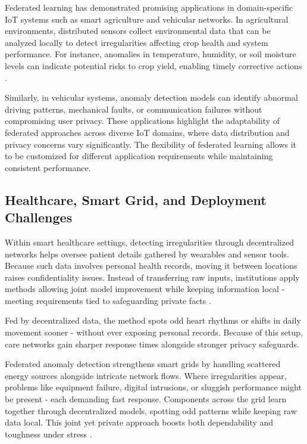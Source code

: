 \documentclass[12pt]{article}
\begin{document}
Federated learning has demonstrated promising applications in domain-specific IoT systems such as smart agriculture and vehicular networks. In agricultural environments, distributed sensors collect environmental data that can be analyzed locally to detect irregularities affecting crop health and system performance. For instance, anomalies in temperature, humidity, or soil moisture levels can indicate potential risks to crop yield, enabling timely corrective actions \cite{paper5,paper6}.

Similarly, in vehicular systems, anomaly detection models can identify abnormal driving patterns, mechanical faults, or communication failures without compromising user privacy. These applications highlight the adaptability of federated approaches across diverse IoT domains, where data distribution and privacy concerns vary significantly. The flexibility of federated learning allows it to be customized for different application requirements while maintaining consistent performance.

\subsection{Healthcare, Smart Grid, and Deployment Challenges}

Within smart healthcare settings, detecting irregularities through decentralized networks helps oversee patient details gathered by wearables and sensor tools. Because such data involves personal health records, moving it between locations raises confidentiality issues. Instead of transferring raw inputs, institutions apply methods allowing joint model improvement while keeping information local - meeting requirements tied to safeguarding private facts \cite{paper9,paper10}.

Fed by decentralized data, the method spots odd heart rhythms or shifts in daily movement sooner - without ever exposing personal records. Because of this setup, care networks gain sharper response times alongside stronger privacy safeguards.

Federated anomaly detection strengthens smart grids by handling scattered energy sources alongside intricate network flows. Where irregularities appear, problems like equipment failure, digital intrusions, or sluggish performance might be present - each demanding fast response. Components across the grid learn together through decentralized models, spotting odd patterns while keeping raw data local. This joint yet private approach boosts both dependability and toughness under stress \cite{paper1,paper3}.
\end{document}
